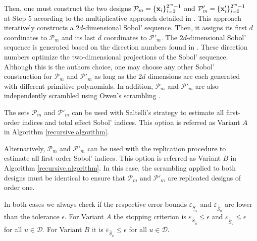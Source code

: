 Then, one must construct the two designs $\mathcal{P}_{m}=\{\boldsymbol{\mathbf{x}}_i\}_{i=0}^{2^{m}-1}$ and $\mathcal{P}'_{m}=\{\boldsymbol{\mathbf{x}}'_i\}_{i=0}^{2^{m}-1}$ at Step $5$ according to the multiplicative approach detailed in \cite{GJAHMP}. This approach iteratively constructs a $2d$-dimensional Sobol' sequence. Then, it assigns its first $d$ coordinates to $\mathcal{P}_{m}$ and its last $d$ coordinates to $\mathcal{P}'_{m}$. The $2d$-dimensional Sobol' sequence is generated based on the direction numbers found in \cite{Kuo}. These direction numbers optimize the two-dimensional projections of the Sobol' sequence. Although this is the authors choice, one may choose any other Sobol' construction for $\mathcal{P}_{m}$ and $\mathcal{P}'_{m}$ as long as the $2d$ dimensions are each generated with different primitive polynomials. In addition, $\mathcal{P}_{m}$ and $\mathcal{P}'_{m}$ are also independently scrambled using Owen's scrambling \cite{HonHic00a,Owe95}.

\bigskip

The sets $\mathcal{P}_{m}$ and $\mathcal{P}'_{m}$ can be used with Saltelli's strategy to estimate all first-order indices and total effect Sobol' indices. This option is referred as Variant $A$ in Algorithm \ref{recursive.algorithm}.

Alternatively, $\mathcal{P}_{m}$ and $\mathcal{P}'_{m}$ can be used with the replication procedure to estimate all first-order Sobol' indices. This option is referred as Variant $B$ in Algorithm \ref{recursive.algorithm}. In this case, the scrambling applied to both designs must be identical to ensure that $\mathcal{P}_{m}$ and $\mathcal{P}'_{m}$ are replicated designs of order one.

In both cases we always check if the respective error bounds $\varepsilon_{\widehat{\underline{S}}_u}$ and $\varepsilon_{\widehat{\overline{S}}_u}$ are lower than the tolerance $\epsilon$. For Variant $A$ the stopping criterion is $\varepsilon_{\widehat{\underline{S}}_u} \leq \epsilon \text{ and } \varepsilon_{\widehat{\overline{S}}_u} \leq \epsilon$ for all $ u \in \mathcal{D}$. For Variant $B$ it is $\varepsilon_{\widehat{\underline{S}}_u} \leq \epsilon$ for all $ u \in \mathcal{D}$. 

